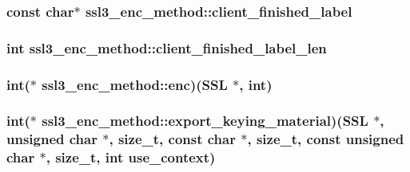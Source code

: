 \hypertarget{structssl3__enc__method_a87df6867ae53bc91ec4c499762e1d33b}{
\subsubsection[{client\-\_\-finished\-\_\-label}]{\setlength{\rightskip}{0pt plus 5cm}const char$\ast$ ssl3\-\_\-enc\-\_\-method\-::client\-\_\-finished\-\_\-label}}\label{structssl3__enc__method_a87df6867ae53bc91ec4c499762e1d33b}
\hypertarget{structssl3__enc__method_a5d7e0116e96a09669eb0afa28f5aa70a}{
\subsubsection[{client\-\_\-finished\-\_\-label\-\_\-len}]{\setlength{\rightskip}{0pt plus 5cm}int ssl3\-\_\-enc\-\_\-method\-::client\-\_\-finished\-\_\-label\-\_\-len}}\label{structssl3__enc__method_a5d7e0116e96a09669eb0afa28f5aa70a}
\hypertarget{structssl3__enc__method_a6793e5dd277dbc19ef08380031c751b8}{
\subsubsection[{enc}]{\setlength{\rightskip}{0pt plus 5cm}int($\ast$ ssl3\-\_\-enc\-\_\-method\-::enc)(S\-S\-L $\ast$, int)}}\label{structssl3__enc__method_a6793e5dd277dbc19ef08380031c751b8}
\hypertarget{structssl3__enc__method_a9b209b57ac54b2cb1eaddae25df08889}{
\subsubsection[{export\-\_\-keying\-\_\-material}]{\setlength{\rightskip}{0pt plus 5cm}int($\ast$ ssl3\-\_\-enc\-\_\-method\-::export\-\_\-keying\-\_\-material)(S\-S\-L $\ast$, unsigned char $\ast$, size\-\_\-t, const char $\ast$, size\-\_\-t, const unsigned char $\ast$, size\-\_\-t, int use\-\_\-context)}}\label{structssl3__enc__method_a9b209b57ac54b2cb1eaddae25df08889}
